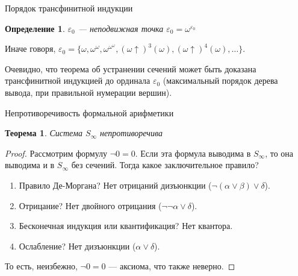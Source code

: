 \documentclass[handout]{beamer}
\newtheorem{thm}{Теорема}[section]
\newtheorem{dfn}{Определение}[section]
\begin{document}
\begin{frame}{Порядок трансфинитной индукции}
\begin{dfn}$\varepsilon_0$ --- неподвижная точка $\varepsilon_0 = \omega^{\varepsilon_0}$\end{dfn}

Иначе говоря, $\varepsilon_0 = \{ \omega, \omega^\omega, \omega^{\omega^\omega}, (\omega \uparrow)^3(\omega), (\omega\uparrow)^4(\omega), \dots \}$.

Очевидно, что теорема об устранении сечений может быть доказана трансфинитной индукцией до ординала $\varepsilon_0$
(максимальный порядок дерева вывода, при правильной нумерации вершин).
\end{frame}

\begin{frame}{Непротиворечивость формальной арифметики}
\begin{thm}Система $S_\infty$ непротиворечива\end{thm}
\begin{proof} \pause
Рассмотрим формулу $\neg 0=0$. 
Если эта формула выводима в $S_\infty$, то она выводима и в $S_\infty$ без сечений.
Тогда какое заключительное правило? \pause
\begin{enumerate}
\item Правило Де-Моргана? \pause Нет отрицаний дизъюнкции ($\neg(\alpha\vee\beta)\vee\delta$). \pause
\item Отрицание? \pause Нет двойного отрицания ($\neg\neg\alpha\vee\delta$). \pause
\item Бесконечная индукция или квантификация? \pause Нет квантора. \pause
\item Ослабление? \pause Нет дизъюнкции ($\alpha \vee \delta$). \pause
\end{enumerate}

То есть, неизбежно, $\neg 0=0$ --- аксиома, что также неверно.
\end{proof}
\end{frame}
\end{document}
